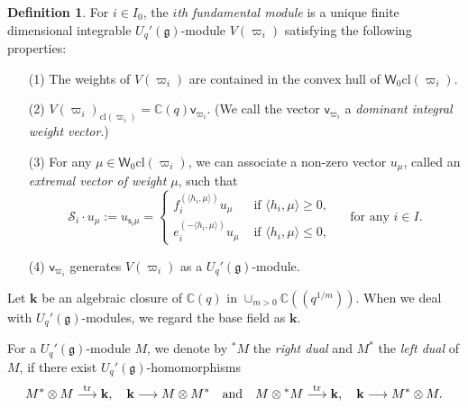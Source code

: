 \documentclass[11pt, leqno]{amsart}
\theoremstyle{definition}
\newtheorem{definition}[theorem]{Definition}
\numberwithin{equation}{section}
\begin{document}
\begin{definition} \cite[\S 1.3]{AK} \label{def: fundamental module}
For $i \in I_0$, the {\it $i$th fundamental module} is a unique finite dimensional integrable $U_q'({\mathfrak g})$-module $V({\varpi}_i)$ satisfying the following properties:
\begin{enumerate}
\item[(1)] The weights of $V({\varpi}_i)$ are contained in the convex hull of $\mathsf{W}_0{\mathrm{cl}}({\varpi}_i)$.
\item[(2)] $V({\varpi}_i)_{{\mathrm{cl}}({\varpi}_i)}={\mathbb C}(q) \mathsf{v}_{{\varpi}_i}$. (We call the vector $\mathsf{v}_{{\varpi}_i}$ a {\it dominant integral weight vector}.)
\item[(3)] For any $\mu \in \mathsf{W}_0{\mathrm{cl}}({\varpi}_i)$, we can associate a non-zero vector $u_\mu$, called an {\it extremal vector of weight $\mu$}, such that
\begin{equation} \label{eq: extremal}
\mathcal{S}_i\cdot u_\mu {\mathbin{:=}}  u_{{\mathsf{s}}_i\mu}= \begin{cases} f_i^{(\langle h_i, \mu \rangle)}u_\mu & \text{ if } \langle h_i, \mu \rangle \ge 0, \\
e_i^{(-\langle h_i, \mu \rangle)}u_\mu & \text{ if } \langle h_i, \mu \rangle \le 0, \end{cases} \quad \text{ for any $i \in I$.}
\end{equation}
\item[(4)] $\mathsf{v}_{{\varpi}_i}$ generates $V({\varpi}_i)$ as a ${U_q'({\mathfrak g})}$-module.
\end{enumerate}
\end{definition}

Let ${\mathbf{k}}$ be an algebraic closure of ${\mathbb C}(q)$ in $\cup_{m >0}{\mathbb C}((q^{1/m}))$. When we deal with ${U_q'({\mathfrak g})}$-modules, we regard the base field as ${\mathbf{k}}$.

For a ${U_q'({\mathfrak g})}$-module $M$, we denote by ${}^*M$ the {\it right dual} and $M^*$ the {\it left dual} of $M$, if there exist $U_q'({\mathfrak g})$-homomorphisms
$$ M^* \otimes M \overset{{\rm tr}}{\longrightarrow} {\mathbf{k}}, \quad {\mathbf{k}} \longrightarrow  M \otimes M^*
\quad \text{and} \quad  M \otimes {}^*M \overset{{\rm tr}}{\longrightarrow} {\mathbf{k}}, \quad {\mathbf{k}} \longrightarrow  M{}^* \otimes M.$$
\end{document}
